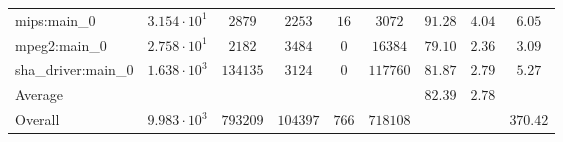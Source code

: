 \begin{tabular}{|l|c|c|c|c|c|c|c|c|}
mips:main\_0            & $ 3.154 \cdot 10^{1} $ & $ 2879   $ & $ 2253   $ & $ 16  $ & $ 3072   $ & $ 91.28       $ & $ 4.04    $ & $ 6.05    $ \\
mpeg2:main\_0           & $ 2.758 \cdot 10^{1} $ & $ 2182   $ & $ 3484   $ & $ 0   $ & $ 16384  $ & $ 79.10       $ & $ 2.36    $ & $ 3.09    $ \\
sha\_driver:main\_0     & $ 1.638 \cdot 10^{3} $ & $ 134135 $ & $ 3124   $ & $ 0   $ & $ 117760 $ & $ 81.87       $ & $ 2.79    $ & $ 5.27    $ \\
\hline
Average                 & $                    $ & $        $ & $        $ & $     $ & $        $ & $ 82.39       $ & $ 2.78    $ & $         $ \\
\hline
Overall                 & $ 9.983 \cdot 10^{3} $ & $ 793209 $ & $ 104397 $ & $ 766 $ & $ 718108 $ & $             $ & $         $ & $ 370.42  $ \\
\hline
\end{tabular}
